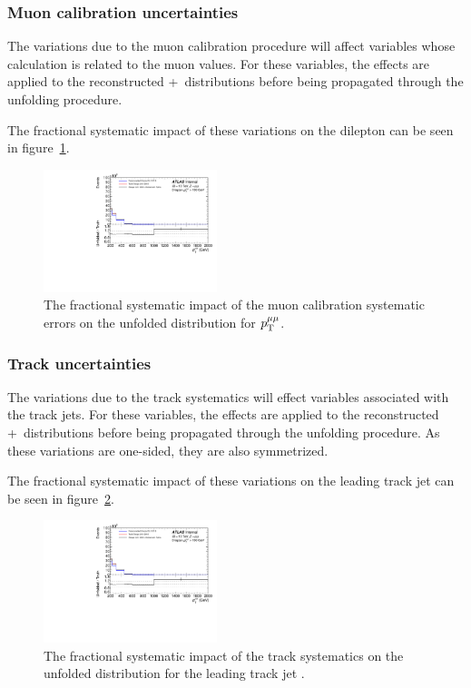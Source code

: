 \subsubsection{Muon calibration uncertainties}
The variations due to the muon calibration procedure will affect variables whose calculation is related to the muon \pt values. For these variables, the effects are applied to the reconstructed \powheg+\pythia~distributions before being propagated through the unfolding procedure.

The fractional systematic impact of these variations on the dilepton \pt can be seen in figure~\ref{fig:muCalSystErr}.

\begin{figure}[h!]
  \centering
  \includegraphics[page=32,width=0.45\textwidth]{figures/IBUPlots.pdf}
  \caption{The fractional systematic impact of the muon calibration systematic errors on the unfolded distribution for $p_\mathrm{T}^{\mu\mu}$.}
  \label{fig:muCalSystErr}
\end{figure}

\subsubsection{Track uncertainties}
The variations due to the track systematics will effect variables associated with the track jets. For these variables, the effects are applied to the reconstructed \powheg+\pythia~distributions before being propagated through the unfolding procedure. As these variations are one-sided, they are also symmetrized.

The fractional systematic impact of these variations on the leading track jet \pt can be seen in figure~\ref{fig:trackSystErr}.

\begin{figure}[h!]
  \centering
  \includegraphics[page=150,width=0.45\textwidth]{figures/IBUPlots.pdf}
  \caption{The fractional systematic impact of the track systematics on the unfolded distribution for the leading track jet \pt.}
  \label{fig:trackSystErr}
\end{figure}

